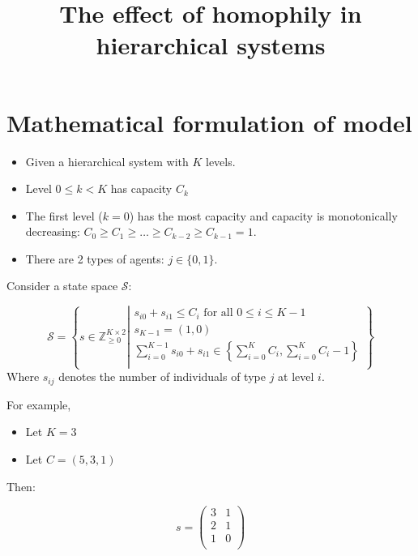 \documentclass{article}
\title{The effect of homophily in hierarchical systems}
\renewcommand{\S}{\mathcal{S}}
\begin{document}
\maketitle


\section{Mathematical formulation of model}

\begin{itemize}
    \item Given a hierarchical system with \(K\) levels.
    \item Level \(0\leq k < K\) has capacity \(C_k\)
    \item The first level (\(k=0\)) has the most capacity and capacity is
        monotonically decreasing: \(C_0 \geq C_1 \geq \dots \geq C_{k-2} \geq C_{k-1} = 1\).
    \item There are 2 types of agents: \(j\in\{0, 1\}\).
\end{itemize}

Consider a state space \(\S\):

\begin{equation}\label{eqn:state_space}
    \S = \left\{s \in \mathbb{Z} ^ {K \times 2} _ {\geq 0}\left|
        \begin{array}{l}
        s_{i0} + s_{i1} \leq C_i\text{ for all }0\leq i \leq K - 1\\
        s_{K-1} = (1, 0)\\
        \sum_{i=0}^{K - 1}s_{i0} + s_{i1} \in\left\{\sum_{i=0}^{K}C_i, \sum_{i=0}^{K}C_i - 1\right\}\\

        \end{array}
                \right.\right\}
\end{equation}
Where \(s_{ij}\) denotes the number of individuals of type \(j\) at level \(i\).

For example,

\begin{itemize}
    \item Let \(K = 3\)
    \item Let \(C = (5, 3, 1)\)
\end{itemize}

Then:

\[
    s = \begin{pmatrix}
        3 & 1 \\
        2 & 1 \\
        1 & 0 \\
    \end{pmatrix}
\]
\end{document}
